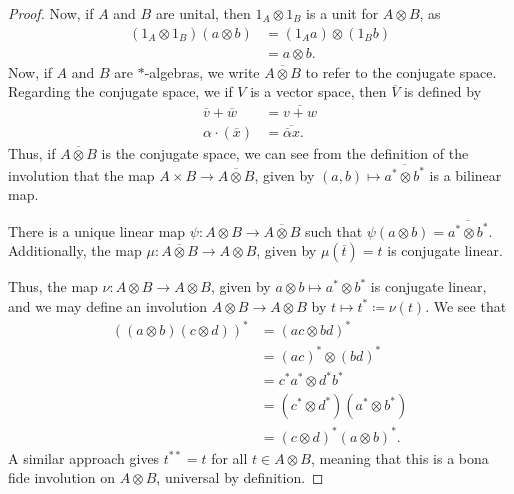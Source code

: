 \begin{proof}
  Now, if $A$ and $B$ are unital, then $1_A\otimes 1_B$ is a unit for $A\otimes B$, as
  \begin{align*}
    \left( 1_A\otimes 1_B \right)\left( a\otimes b \right) &= \left( 1_A a \right)\otimes \left( 1_B b \right)\\
                                                           &= a\otimes b.
  \end{align*}
  Now, if $A$ and $B$ are $\ast$-algebras, we write $\overline{A\otimes B}$ to refer to the conjugate space. Regarding the conjugate space, we if $V$ is a vector space, then $\overline{V}$ is defined by
  \begin{align*}
    \overline{v} + \overline{w} &= \overline{v+w}\\
    \alpha\cdot \left( \overline{x} \right) &= \overline{\overline{\alpha}x}.
  \end{align*}
  Thus, if $\overline{A\otimes B}$ is the conjugate space, we can see from the definition of the involution that the map $A\times B \rightarrow \overline{A\otimes B}$, given by $\left( a,b \right)\mapsto \overline{a^{\ast}\otimes b^{\ast}}$ is a bilinear map.\newline

  There is a unique linear map $\psi\colon A\otimes B \rightarrow \overline{A\otimes B}$ such that $\psi\left( a\otimes b \right) = \overline{a^{\ast}\otimes b^{\ast}}$. Additionally, the map $\mu\colon \overline{A\otimes B}\rightarrow A\otimes B$, given by $\mu\left( \overline{t} \right) = t$ is conjugate linear.\newline

  Thus, the map $\nu\colon A\otimes B \rightarrow A\otimes B$, given by $a\otimes b \mapsto a^{\ast}\otimes b^{\ast}$ is conjugate linear, and we may define an involution $A\otimes B \rightarrow A\otimes B$ by $t\mapsto t^{\ast}\coloneq \nu(t)$. We see that
  \begin{align*}
    \left( \left( a\otimes b \right)\left( c\otimes d \right) \right)^{\ast} &= \left( ac\otimes bd \right)^{\ast}\\
                                                                             &= \left( ac \right)^{\ast}\otimes \left( bd \right)^{\ast}\\
                                                                             &= c^{\ast}a^{\ast} \otimes d^{\ast}b^{\ast}\\
                                                                             &= \left( c^{\ast}\otimes d^{\ast} \right)\left( a^{\ast}\otimes b^{\ast} \right)\\
                                                                             &= \left( c\otimes d \right)^{\ast}\left( a\otimes b \right)^{\ast}.
  \end{align*}
  A similar approach gives $t^{\ast\ast} = t$ for all $t\in A\otimes B$, meaning that this is a bona fide involution on $A\otimes B$, universal by definition.
\end{proof}
